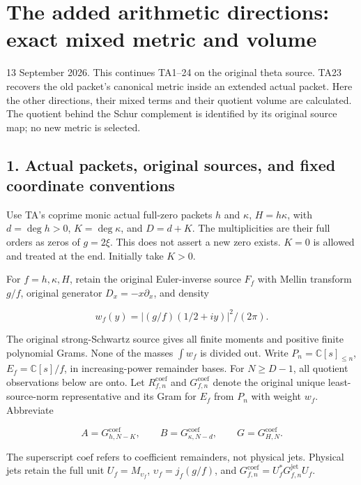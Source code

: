 \section{The added arithmetic directions: exact mixed metric and volume}\label{EM-the-added-arithmetic-directions-exact-mixed-metric-and-volume}

13 September 2026. This continues TA1--24 on the original theta source.
TA23 recovers the old packet's canonical metric inside an extended actual
packet. Here the other directions, their mixed terms and their quotient
volume are calculated. The quotient behind the Schur complement is
identified by its original source map; no new metric is selected.

\subsection{1. Actual packets, original sources, and fixed coordinate conventions}\label{EM-actual-packets-original-sources-and-fixed-coordinate-conventions}

Use TA's coprime monic actual full-zero packets \(h\) and \(\kappa\), \(H=h\kappa\),
with \(d=\deg h>0\), \(K=\deg\kappa\), and \(D=d+K\). The multiplicities are their
full orders as zeros of \(g=2\xi\). This does not assert a new zero exists.
\(K=0\) is allowed and treated at the end. Initially take \(K>0\).

For \(f=h,\kappa,H\), retain the original Euler-inverse source \(F_f\) with
Mellin transform \(g/f\), original generator \(D_x=-x\partial_x\), and density

\[
w_f(y)=|(g/f)(1/2+iy)|^2/(2\pi).
\]

The original strong-Schwartz source gives all finite moments and positive
finite polynomial Grams. None of the masses \(\int w_f\) is divided out.
Write \(P_n=\mathbb C[s]_{\le n}\), \(E_f=\mathbb C[s]/f\), in increasing-power remainder bases.
For \(N\ge D-1\), all quotient observations below are onto. Let \(R_{f,n}^{\mathrm{coef}}\)
and \(G_{f,n}^{\mathrm{coef}}\) denote the original unique least-source-norm representative
and its Gram for \(E_f\) from \(P_n\) with weight \(w_f\). Abbreviate

\[
A=G_{h,N-K}^{\mathrm{coef}},\qquad B=G_{\kappa,N-d}^{\mathrm{coef}},\qquad G=G_{H,N}^{\mathrm{coef}}.
\]

The superscript \(\mathrm{coef}\) refers to coefficient remainders, not physical jets.
Physical jets retain the full unit \(U_f=M_{\upsilon_f}\), \(\upsilon_f=j_f(g/f)\),
and \(G_{f,n}^{\mathrm{coef}}=U_f^*G_{f,n}^{\mathrm{jet}}U_f\).

